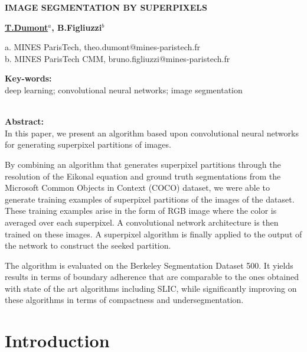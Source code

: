 \documentclass{article}
\begin{document}
\begin{center}
    \begin{Large}\textbf{IMAGE SEGMENTATION BY SUPERPIXELS}\end{Large}

    \vspace{1cm}
    \begin{large}\textbf{\underline{T.Dumont$^a$}, B.Figliuzzi$^b$}\end{large}

    \vspace{0.5cm}
    a. MINES ParisTech, theo.dumont@mines-paristech.fr\\
    b. MINES ParisTech CMM, bruno.figliuzzi@mines-paristech.fr
    \vspace{1cm}
\end{center}

\begin{center}

\noindent\textbf{Key-words: }\\
deep learning; convolutional neural networks; image segmentation\\
\ \\
\end{center}
\textbf{Abstract: }\\
In this paper, we present an algorithm based upon convolutional neural networks for generating superpixel partitions of images.
\par
By combining an algorithm that generates superpixel partitions through the resolution of the Eikonal equation and ground truth segmentations from the Microsoft Common Objects in Context (COCO) dataset, we were able to generate training examples of superpixel partitions of the images of the dataset. These training examples arise in the form of RGB image where the color is averaged over each superpixel. A convolutional network architecture is then trained on these images. A superpixel algorithm is finally applied to the output of the network to construct the seeked partition.
\par
The algorithm is evaluated on the Berkeley Segmentation Dataset 500. It yields results in terms of boundary adherence that are comparable to the ones obtained with state of the art algorithms including SLIC, while significantly improving on these algorithms in terms of compactness and undersegmentation.


\section{Introduction}
\end{document}
